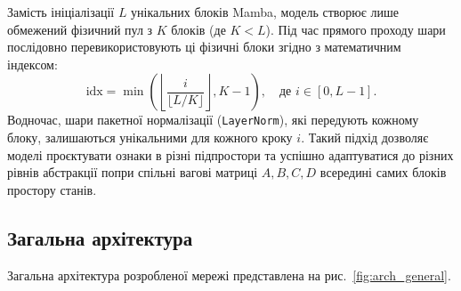             Замість ініціалізації $L$ унікальних блоків Mamba, модель створює лише обмежений фізичний пул з $K$ блоків (де $K < L$).
            Під час прямого проходу шари послідовно перевикористовують ці фізичні блоки згідно з математичним індексом:
            \begin{equation*}
                \mathrm{idx} = \min\left(\left\lfloor \frac{i}{\lfloor L / K \rfloor} \right\rfloor, K - 1\right), \quad \text{де } i \in [0, L-1].
            \end{equation*}
            Водночас, шари пакетної нормалізації (\texttt{LayerNorm}), які передують кожному блоку, залишаються унікальними для кожного кроку $i$.
            Такий підхід дозволяє моделі проєктувати ознаки в різні підпростори та успішно адаптуватися до різних рівнів абстракції попри спільні вагові матриці $A, B, C, D$ всередині самих блоків простору станів.

        \subsection{Загальна архітектура}
            Загальна архітектура розробленої мережі представлена на рис.~\ref{fig:arch_general}.

